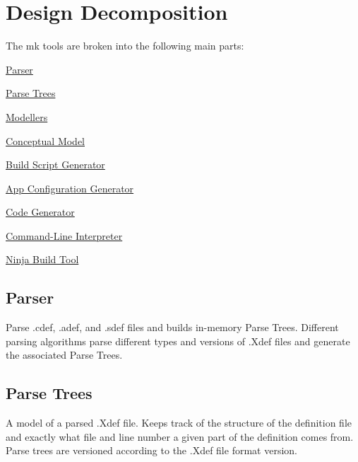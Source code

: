 \hypertarget{mkToolsDesign_mkToolsDesign_Decomposition}{}\section{Design Decomposition}\label{mkToolsDesign_mkToolsDesign_Decomposition}
The mk tools are broken into the following main parts\+:


\begin{DoxyItemize}
\item \hyperlink{mkToolsDesign_mkToolsDesign_parser}{Parser}
\item \hyperlink{mkToolsDesign_mkToolsDesign_parseTrees}{Parse Trees}
\item \hyperlink{mkToolsDesign_mkToolsDesign_modellers}{Modellers}
\item \hyperlink{mkToolsDesign_mkToolsDesign_conceptualModel}{Conceptual Model}
\item \hyperlink{mkToolsDesign_mkToolsDesign_buildScriptGenerator}{Build Script Generator}
\item \hyperlink{mkToolsDesign_mkToolsDesign_appConfigGenerator}{App Configuration Generator}
\item \hyperlink{mkToolsDesign_mkToolsDesign_codeGenerator}{Code Generator}
\item \hyperlink{mkToolsDesign_mkToolsDesign_commandLineInterpreter}{Command-\/\+Line Interpreter}
\item \hyperlink{mkToolsDesign_mkToolsDesign_ninjaBuildTool}{Ninja Build Tool}
\end{DoxyItemize}\hypertarget{mkToolsDesign_mkToolsDesign_parser}{}\subsection{Parser}\label{mkToolsDesign_mkToolsDesign_parser}
\begin{DoxyVerb}Parse .cdef, .adef, and .sdef files and builds in-memory Parse Trees.  Different parsing
algorithms parse different types and versions of .Xdef files and generate the
associated Parse Trees.
\end{DoxyVerb}
\hypertarget{mkToolsDesign_mkToolsDesign_parseTrees}{}\subsection{Parse Trees}\label{mkToolsDesign_mkToolsDesign_parseTrees}
\begin{DoxyVerb}A model of a parsed .Xdef file.  Keeps track of the structure of the definition file
and exactly what file and line number a given part of the definition comes from.
Parse trees are versioned according to the .Xdef file format version.
\end{DoxyVerb}
